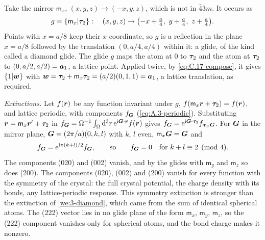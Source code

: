Take the mirror $\mathsf{m}_x$, $(x, y, z) \to (-x, y, z)$, which is not in $\bar43m$. It occurs as
\begin{equation}
  g = \{\mathsf{m}_x|\bm{\tau}_2\}: \quad (x, y, z) \to \bigl(-x + \tfrac a4,\ y + \tfrac a4,\ z + \tfrac a4\bigr) .
  \label{eq:C.17-glide}
\end{equation}
Points with $x = a/8$ keep their $x$ coordinate, so $g$ is a reflection in the plane $x = a/8$ followed by the translation $(0, a/4, a/4)$ within it: a glide, of the kind called a diamond glide. The glide $g$ maps the atom at $0$ to $\bm{\tau}_2$ and the atom at $\bm{\tau}_2$ to $(0, a/2, a/2) = \bm{a}_1$, a lattice point. Applied twice, by \cref{eq:C.17-compose}, it gives $\{1|\bm{w}\}$ with $\bm{w} = \bm{\tau}_2 + \mathsf{m}_x\bm{\tau}_2 = (a/2)(0, 1, 1) = \bm{a}_1$, a lattice translation, as required.

\emph{Extinctions.} Let $f(\bm{r})$ be any function invariant under $g$, $f(\mathsf{m}_x\bm{r} + \bm{\tau}_2) = f(\bm{r})$, and lattice periodic, with components $f_{\bm{G}}$ (\cref{eq:A.3-periodic}). Substituting $\bm{r} = \mathsf{m}_x\bm{r}' + \bm{\tau}_2$ in $f_{\bm{G}} = \Omega^{-1}\int_\Omega\mathrm{d}^3r\,\mathrm{e}^{\mathrm{i}\bm{G}\cdot\bm{r}}f(\bm{r})$ gives $f_{\bm{G}} = \mathrm{e}^{\mathrm{i}\bm{G}\cdot\bm{\tau}_2}f_{\mathsf{m}_x\bm{G}}$. For $\bm{G}$ in the mirror plane, $\bm{G} = (2\pi/a)(0, k, l)$ with $k$, $l$ even, $\mathsf{m}_x\bm{G} = \bm{G}$ and
\begin{equation}
  f_{\bm{G}} = \mathrm{e}^{\mathrm{i}\pi(k + l)/2}f_{\bm{G}}, \qquad\text{so}\qquad f_{\bm{G}} = 0 \quad\text{for } k + l \equiv 2 \pmod 4 .
  \label{eq:C.17-extinct}
\end{equation}
The components (020) and (002) vanish, and by the glides with $\mathsf{m}_y$ and $\mathsf{m}_z$ so does (200). The components (020), (002) and (200) vanish for every function with the symmetry of the crystal: the full crystal potential, the charge density with its bonds, any lattice-periodic response. This symmetry extinction is stronger than the extinction of \cref{we:3-diamond}, which came from the sum of identical spherical atoms. The (222) vector lies in no glide plane of the form $\mathsf{m}_x$, $\mathsf{m}_y$, $\mathsf{m}_z$, so the (222) component vanishes only for spherical atoms, and the bond charge makes it nonzero.

